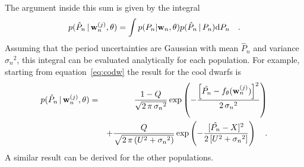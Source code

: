 The argument inside this sum is given by the integral
\begin{equation}
p(\hat{P}_n\,|\,\mathbf{w}_n^{(j)},\theta) =
    \int p(P_n|\mathbf{w}_n,\theta) p(\hat{P}_n\,|\,P_n) {\rm d}P_n \quad.
\end{equation}
Assuming that the period uncertainties are Gaussian with mean $\hat{P}_n$
and variance ${\sigma_n}^2$, this integral can be evaluated analytically for
each population.
For example, starting from equation~\ref{eq:codw} the result for the cool
dwarfs is
\begin{eqnarray} \label{eq:cool_dwarfs}
p(\hat{P}_n\,|\,\mathbf{w}_n^{(j)},\theta) &=&
    \frac{1-Q}{\sqrt{2\,\pi\,{\sigma_n}^2}} \exp\left( -
        \frac{\left[\hat{P_n} - f_\theta (\mathbf{w}_n^{(j)}) \right] ^2}
             {2\,{\sigma_n}^2}\right) \nonumber\\
    && +
    \frac{Q}{\sqrt{2\,\pi\,(U^2 + {\sigma_n}^2)}} \exp\left( -
        \frac{[\hat{P_n} - X] ^2}{2\,[U^2 + {\sigma_n}^2]}\right) \quad.
\end{eqnarray}
A similar result can be derived for the other populations.

